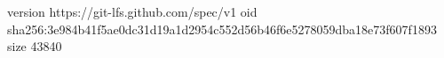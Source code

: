 version https://git-lfs.github.com/spec/v1
oid sha256:3e984b41f5ae0dc31d19a1d2954c552d56b46f6e5278059dba18e73f607f1893
size 43840
